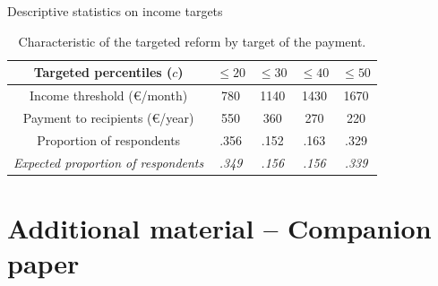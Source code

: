 \documentclass[aspectratio=169,9pt,dvipsnames]{beamer}
\begin{document}
\begin{frame}{Descriptive statistics on income targets}

\begin{table}
\caption{\label{tab:Compensation-amount-by}Characteristic of the targeted
reform by target of the payment.}
\centering%
\begin{tabular}{ccccc}
\hline 
\hline 
Targeted percentiles ($c$) & $\leq20$ & $\leq30$ & $\leq40$ & $\leq50$\tabularnewline
\hline 
Income threshold (\euro{}/month) & 780 & 1140 & 1430 & 1670\tabularnewline
Payment to recipients (\euro{}/year) & 550 & 360 & 270 & 220\tabularnewline
Proportion of respondents & .356 & .152 & .163 & .329\tabularnewline
\emph{Expected proportion of respondents} & \emph{.349} & \emph{.156} & \emph{.156} & \emph{.339}\tabularnewline
\hline 
\hline 
\end{tabular}

\end{table}
\medskip
\hyperlink{income_origin}{}
    

\end{frame}



\section{Additional material -- Companion paper}
\end{document}
